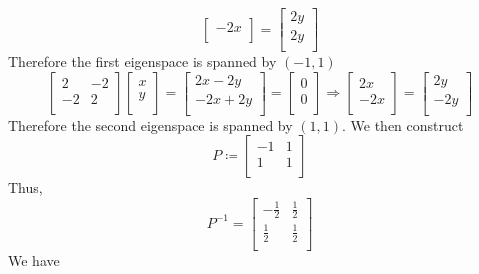 \begin{solution}
\[\begin{bmatrix}
              -2x\\
        \end{bmatrix} = \begin{bmatrix}
             2y \\
             2y \\
        \end{bmatrix}
    \]
    Therefore the first eigenspace is spanned by \((-1,1)\) 
    \[
        \begin{bmatrix}
            2 &-2   \\
             -2&2   \\
        \end{bmatrix} \begin{bmatrix}
             x \\
             y \\
        \end{bmatrix} = \begin{bmatrix}
             2x - 2y \\
              -2x + 2y\\
        \end{bmatrix} = \begin{bmatrix}
             0 \\
             0 \\
        \end{bmatrix} \Longrightarrow \begin{bmatrix}
             2x \\
             -2x \\
        \end{bmatrix} = \begin{bmatrix}
             2y \\
             -2y \\
        \end{bmatrix}
    \]
    Therefore the second eigenspace is spanned by \((1,1)\). We then construct
    \[
        P\coloneqq \begin{bmatrix}
            -1 & 1  \\
            1 & 1  \\
        \end{bmatrix}
    \]
    Thus,
    \[
        P ^{-1} =\begin{bmatrix}
            -\frac{1}{2} &\frac{1}{2}   \\
             \frac{1}{2}&\frac{1}{2}   \\
        \end{bmatrix}
    \]
    We have
    \[
\]
\end{solution}
